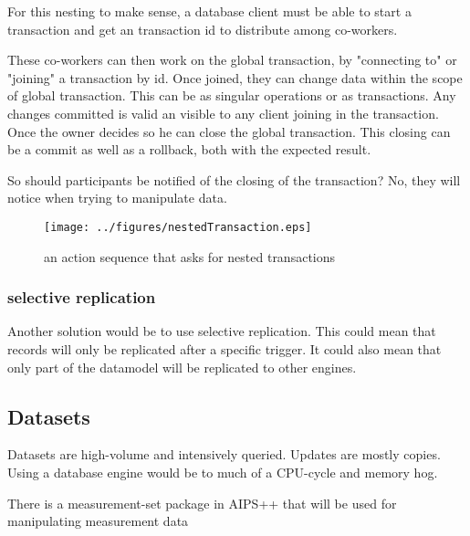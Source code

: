 \documentclass[]{lofar}
\begin{document}
        For this nesting to make sense, a database client must be able
        to start a transaction and get an transaction id to distribute
        among co-workers.

        These co-workers can then work on the global transaction, by
        "connecting to" or "joining" a transaction by id. Once joined,
        they can change data within the scope of global
        transaction. This can be as singular operations or as
        transactions. Any changes committed is valid an visible to any
        client joining in the transaction. Once the owner decides so
        he can close the global transaction. This closing can be a
        commit as well as a rollback, both with the expected result.
     
        So should participants be notified of the closing of the
        transaction?  No, they will notice when trying to manipulate
        data.

        \begin{figure}
          \texttt{[image: ../figures/nestedTransaction.eps]}
          \hypertarget{fig:nestedTransaction}{}
          \caption{an action sequence that asks for nested transactions\label{fig:nestedTransactions}}
        \end{figure}

      \subsubsection{selective replication}
      \label{subsubsec:selective-replication}\hypertarget{subsubsec:selective-replication}{}%

        Another solution would be to use selective replication. This
        could mean that records will only be replicated after a
        specific trigger. It could also mean that only part of the
        datamodel will be replicated to other engines.

    \subsection{Datasets}
    \label{subsec:Datasets}\hypertarget{subsec:Datasets}{}%

      Datasets are high-volume and intensively queried. Updates are
      mostly copies. Using a database engine would be to much of a
      CPU-cycle and memory hog.

      \begin{assumption}
        There is a measurement-set package in AIPS++ that will be used
        for manipulating measurement data
        \caption{measurement-set package\label{ass:aips++}}
      \end{assumption}
\end{document}
